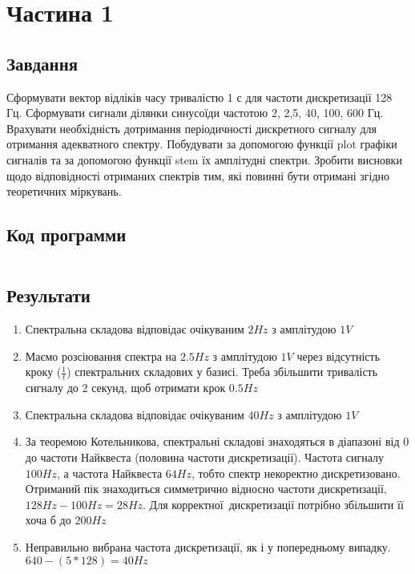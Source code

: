 \section{Частина 1}
\label{sec:task1}

\subsection{Завдання}
\label{subsec:task1_task}

Сформувати вектор відліків часу тривалістю 1 с для частоти
дискретизації 128 Гц. Сформувати сигнали ділянки синусоїди частотою 2, 2,5,
40, 100, 600 Гц. Врахувати необхідність дотримання періодичності дискретного
сигналу для отримання адекватного спектру. Побудувати за допомогою функції
plot графіки сигналів та за допомогою функції stem їх амплітудні спектри. Зробити висновки щодо відповідності отриманих спектрів тим, які
повинні бути отримані згідно теоретичних міркувань.

\subsection{Код программи}
\label{subsec:task1_code}
\inputminted{python}{../src/task1.py}

\subsection{Результати}
\label{subsec:task1_results}

\begin{enumerate}
    \item Спектральна складова відповідає очікуваним $2 Hz$ з амплітудою $1 V$
    \item Маємо розсіювання спектра на $2.5 Hz$ з амплітудою $1 V$
          через відсутність кроку ($\frac{1}{t}$) спектральних складових у базисі.
          Треба збільшити тривалість сигналу до 2 секунд, щоб отримати крок $0.5 Hz$
    \item Спектральна складова відповідає очікуваним $40 Hz$ з амплітудою $1 V$
    \item За теоремою Котельникова, спектральні складові
          знаходяться в діапазоні від 0 до частоти Найквеста
          (половина частоти дискретизації).
          Частота сигналу $100 Hz$, а частота Найквеста $64 Hz$,
          тобто спектр некоректно дискретизовано.
          Отриманий пік знаходиться симметрично відносно частоти дискретизації,
          $128 Hz - 100 Hz = 28 Hz$.
          Для корректної дискретизації потрібно збільшити її хоча б до $200 Hz$
    \item Неправильно вибрана частота дискретизації, як і у попередньому випадку.
          $640 - (5 * 128) = 40 Hz$
\end{enumerate}

